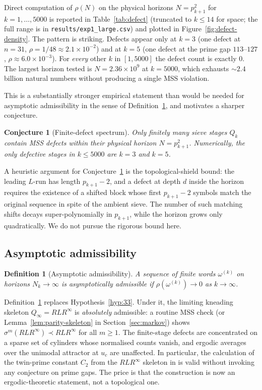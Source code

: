 \documentclass[cupthm,crop,info]{CUP-JNL-ETS}
\theoremstyle{cupplain}
\newtheorem{conjecture}[theorem]{Conjecture}
\theoremstyle{cupdefinition}
\newtheorem{definition}[theorem]{Definition}
\theoremstyle{cupremark}
\numberwithin{equation}{section}
\begin{document}
Direct computation of $\rho(N)$ on the physical horizons
$N = p_{k+1}^2$ for $k = 1, \ldots, 5000$ is reported in
Table~\ref{tab:defect} (truncated to $k \leq 14$ for space; the full
range is in \texttt{results/exp1\_large.csv}) and plotted in
Figure~\ref{fig:defect-density}. The pattern is striking. Defects
appear only at $k = 3$ (one defect at $n = 31$,
$\rho = 1/48 \approx 2.1 \times 10^{-2}$) and at $k = 5$ (one defect at
the prime gap $113$--$127$, $\rho \approx 6.0 \times 10^{-3}$). For
\emph{every} other $k$ in $[1, 5000]$ the defect count is exactly $0$.
The largest horizon tested is $N = 2.36 \times 10^9$ at $k = 5000$,
which exhausts $\sim 2.4$ billion natural numbers without producing a
single MSS violation.

This is a substantially stronger empirical statement than would be
needed for asymptotic admissibility in the sense of
Definition~\ref{def:asymp-admiss}, and motivates a sharper conjecture.

\begin{conjecture}[Finite-defect spectrum]
\label{conj:finite-defects}
Only finitely many sieve stages $Q_k$ contain MSS defects within their
physical horizon $N = p_{k+1}^2$. Numerically, the only defective stages
in $k \leq 5000$ are $k = 3$ and $k = 5$.
\end{conjecture}

A heuristic argument for Conjecture~\ref{conj:finite-defects} is the
topological-shield bound: the leading $L$-run has length $p_{k+1} - 2$,
and a defect at depth $d$ inside the horizon requires the existence of
a shifted block whose first $p_{k+1} - 2$ symbols match the original
sequence in spite of the ambient sieve. The number of such matching
shifts decays super-polynomially in $p_{k+1}$, while the horizon grows
only quadratically. We do not pursue the rigorous bound here.

\subsection{Asymptotic admissibility}

\begin{definition}[Asymptotic admissibility]
\label{def:asymp-admiss}
A sequence of finite words $\omega^{(k)}$ on horizons $N_k \to \infty$
is \emph{asymptotically admissible} if $\rho(\omega^{(k)}) \to 0$ as
$k \to \infty$.
\end{definition}

Definition~\ref{def:asymp-admiss} replaces Hypothesis~\ref{hyp:33}.
Under it, the limiting kneading skeleton $Q_\infty = R L R^\infty$ is
\emph{absolutely} admissible: a routine MSS check (or
Lemma~\ref{lem:parity-skeleton} in Section~\ref{sec:markov}) shows
$\sigma^m(R L R^\infty) \prec R L R^\infty$ for all $m \geq 1$. The
finite-stage defects are concentrated on a sparse set of cylinders
whose normalised counts vanish, and ergodic averages over the unimodal
attractor at $u_c$ are unaffected. In particular, the calculation of
the twin-prime constant $C_2$ from the $RLR^\infty$ skeleton in
\cite{wang2026emergence} is valid without invoking any conjecture on
prime gaps. The price is that the construction is now an
ergodic-theoretic statement, not a topological one.
\end{document}

